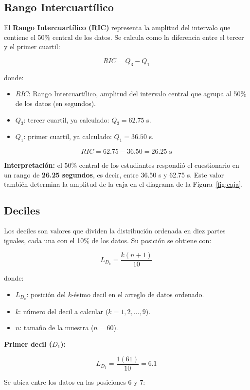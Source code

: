 \documentclass[12pt,letterpaper]{article}
\begin{document}
\subsection{Rango Intercuartílico}

El \textbf{Rango Intercuartílico (RIC)} representa la amplitud del intervalo que contiene el 50\% central de los datos. Se calcula como la diferencia entre el tercer y el primer cuartil:

\[
RIC = Q_3 - Q_1
\]

donde:
\begin{itemize}[leftmargin=1.2cm]
    \item $RIC$: Rango Intercuartílico, amplitud del intervalo central que agrupa al 50\% de los datos (en segundos).
    \item $Q_3$: tercer cuartil, ya calculado: $Q_3 = 62.75$ s.
    \item $Q_1$: primer cuartil, ya calculado: $Q_1 = 36.50$ s.
\end{itemize}

\[
RIC = 62.75 - 36.50 = 26.25 \text{ s}
\]

\textbf{Interpretación:} el 50\% central de los estudiantes respondió el cuestionario en un rango de \textbf{26.25 segundos}, es decir, entre 36.50 s y 62.75 s. Este valor también determina la amplitud de la caja en el diagrama de la Figura~\ref{fig:caja}.

\subsection{Deciles}

Los deciles son valores que dividen la distribución ordenada en diez partes iguales, cada una con el 10\% de los datos. Su posición se obtiene con:

\[
L_{D_k}=\frac{k(n+1)}{10}
\]

donde:
\begin{itemize}[leftmargin=1.2cm]
    \item $L_{D_k}$: posición del $k$-ésimo decil en el arreglo de datos ordenado.
    \item $k$: número del decil a calcular ($k = 1, 2, \ldots, 9$).
    \item $n$: tamaño de la muestra ($n = 60$).
\end{itemize}

\textbf{Primer decil ($D_1$):}

\[
L_{D_1}=\frac{1(61)}{10}=6.1
\]

Se ubica entre los datos en las posiciones 6 y 7:
\end{document}
